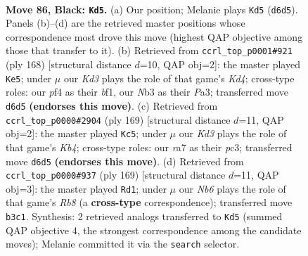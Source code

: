 \documentclass[11pt]{article}
\begin{document}
\clearpage

\begin{figure}[p]\centering
\begin{subfigure}{0.46\textwidth}\centering
\resizebox{\linewidth}{!}{%
\newchessgame
\chessboard[
  setfen={8/R6P/3k2p1/5p2/5P2/1n6/6K1/8 b - - 6 86},
  showmover=false,
  pgfstyle=straightmove, color=movearrow, markmove={d6-d5}
]}
\caption{}
\end{subfigure}\hfill
\begin{subfigure}{0.46\textwidth}\centering
\resizebox{\linewidth}{!}{%
\newchessgame
\chessboard[
  setfen={5k2/8/7P/pp4P1/3K4/P7/8/5b2 w - - 35 85},
  showmover=false,
  pgfstyle=straightmove, color=movearrow, markmove={d4-e5}
]}
\caption{}
\end{subfigure}
\\[4pt]
\begin{subfigure}{0.46\textwidth}\centering
\resizebox{\linewidth}{!}{%
\newchessgame
\chessboard[
  setfen={8/8/8/1k4p1/5pP1/2PK4/8/8 b - - 6 85},
  showmover=false,
  pgfstyle=straightmove, color=movearrow, markmove={b5-c5}
]}
\caption{}
\end{subfigure}\hfill
\begin{subfigure}{0.46\textwidth}\centering
\resizebox{\linewidth}{!}{%
\newchessgame
\chessboard[
  setfen={8/5k2/R7/6p1/6P1/4P3/5K2/1r6 b - - 36 85},
  showmover=false,
  pgfstyle=straightmove, color=movearrow, markmove={b1-d1}
]}
\caption{}
\end{subfigure}
\caption{\textbf{Move 86, Black: \texttt{Kd5}.} (a) Our position; Melanie plays \texttt{Kd5} (\texttt{d6d5}). Panels (b)--(d) are the retrieved master positions whose correspondence most drove this move (highest QAP objective among those that transfer to it). (b) Retrieved from \texttt{ccrl\_top\_p0001\#921} (ply 168) [structural distance $d$=10, QAP obj=2]: the master played \texttt{Ke5}; under $\mu$ our \emph{Kd3} plays the role of that game's \emph{Kd4}; cross-type roles: our \emph{p}f4 as their \emph{b}f1, our \emph{N}b3 as their \emph{P}a3; transferred move \texttt{d6d5} \textbf{(endorses this move)}. (c) Retrieved from \texttt{ccrl\_top\_p0000\#2904} (ply 169) [structural distance $d$=11, QAP obj=2]: the master played \texttt{Kc5}; under $\mu$ our \emph{Kd3} plays the role of that game's \emph{Kb4}; cross-type roles: our \emph{r}a7 as their \emph{p}c3; transferred move \texttt{d6d5} \textbf{(endorses this move)}. (d) Retrieved from \texttt{ccrl\_top\_p0000\#937} (ply 169) [structural distance $d$=11, QAP obj=3]: the master played \texttt{Rd1}; under $\mu$ our \emph{Nb6} plays the role of that game's \emph{Rb8} (a \textbf{cross-type} correspondence); transferred move \texttt{b3c1}. Synthesis: 2 retrieved analogs transferred to \texttt{Kd5} (summed QAP objective 4, the strongest correspondence among the candidate moves); Melanie committed it via the \texttt{search} selector.}
\label{fig:thought-m171}
\end{figure}
\end{document}
